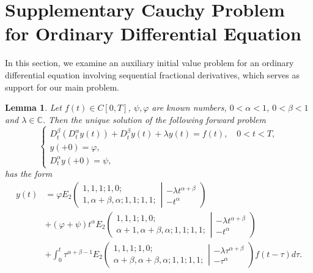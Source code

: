\documentclass{amsart}
\numberwithin{equation}{section}
\newtheorem{lem}[thm]{Lemma}
\begin{document}
 \section{Supplementary Cauchy Problem for  Ordinary Differential Equation}\label{jumaeva:sec:3}
 In this section, we examine an auxiliary initial value problem for an ordinary differential equation involving sequential fractional derivatives, which serves as support for our main problem.
\begin{lem}
Let $f(t)\in C[0,T]$, $\psi,\varphi$ are known numbers, $0< \alpha<1$, $0<\beta<1$ and $\lambda \in \mathbb{C}$. Then the unique solution of the following forward problem
\begin{equation}\label{jumaeva:eq:11}
    \begin{cases}
        D_t^\beta(D_t^\alpha y(t))+D_t^\beta y(t)+\lambda y(t)=f(t),\quad 0<t<T,\\
        y(+0)=\varphi,\\
        D_t^\alpha y(+0)=\psi,
    \end{cases}
\end{equation} has the form
\begin{align}\label{jumaeva:eq:12}
y(t)&= \varphi E_2\left(\begin{array}{c}1, 1, 1; 1, 0; \\1, \alpha+\beta, \alpha ; 1, 1; 1, 1; \end{array}\left| \begin{array}{c}-\lambda t^{\alpha+\beta} \\-t^\alpha\end{array}\right.\right) \nonumber \\
&+(\varphi+\psi)t^\alpha E_2\left(\begin{array}{c}1, 1, 1; 1, 0; \\\alpha+1, \alpha+\beta, \alpha ; 1, 1; 1, 1; \end{array}\left|\begin{array}{c}-\lambda t^{\alpha+\beta} \\-t^\alpha \end{array}\right.\right) \nonumber \\
&+\int_0^t \tau^{\alpha+\beta-1} E_2\left(\begin{array}{c}1, 1, 1; 1, 0; \\\alpha+\beta, \alpha+\beta, \alpha ; 1, 1; 1, 1; \end{array}\left| \begin{array}{c}-\lambda \tau^{\alpha+\beta} \\-\tau^\alpha \end{array}\right.\right) f(t-\tau) d\tau .
\end{align}\label{jumaeva:lem:6}
\end{lem}
\end{document}
